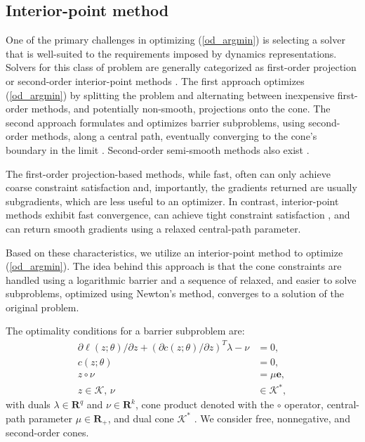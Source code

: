 \subsection{Interior-point method}
One of the primary challenges in optimizing (\ref{od_argmin}) is selecting a solver that is well-suited to the requirements imposed by dynamics representations. Solvers for this class of problem are generally categorized as first-order projection \cite{stellato2020osqp, o2016conic, garstka2019cosmo} or second-order interior-point methods \cite{domahidi2013ecos, vandenberghe2010cvxopt}. The first approach optimizes (\ref{od_argmin}) by splitting the problem and alternating between inexpensive first-order methods, and potentially non-smooth, projections onto the cone. The second approach formulates and optimizes barrier subproblems, using second-order methods, along a central path, eventually converging to the cone's boundary in the limit \cite{boyd2004convex}. Second-order semi-smooth methods also exist \cite{ali2017semismooth}.

The first-order projection-based methods, while fast, often can only achieve coarse constraint satisfaction and, importantly, the gradients returned are usually subgradients, which are less useful to an optimizer. In contrast, interior-point methods exhibit fast convergence, can achieve tight constraint satisfaction \cite{nocedal2006numerical}, and can return smooth gradients using a relaxed central-path parameter.

Based on these characteristics, we utilize an interior-point method \cite{nocedal2006numerical} to optimize (\ref{od_argmin}). The idea behind this approach is that the cone constraints are handled using a logarithmic barrier and a sequence of relaxed, and easier to solve subproblems, optimized using Newton's method, converges to a solution of the original problem. 

The optimality conditions for a barrier subproblem are:
\begin{align}
	\partial \ell(z; \theta) / \partial z + (\partial c(z; \theta) / \partial z)^T \lambda - \nu &= 0, \label{od_opt_cond_lag}\\
	c(z; \theta) &= 0, \label{od_opt_cond_eq} \\
	z \circ \nu &= \mu \mathbf{e}, \label{od_opt_cond_comp} \\
	z \in \mathcal{K}, \, \nu &\in \mathcal{K}^*, \label{od_opt_cond_ineq}
\end{align}
with duals $\lambda \in \mathbf{R}^q$ and $\nu \in \mathbf{R}^k$, cone product denoted with the $\circ$ operator, central-path parameter $\mu \in \mathbf{R}_{+}$, and dual cone $\mathcal{K}^*$ \cite{domahidi2013ecos}. We consider free, nonnegative, and second-order cones.

